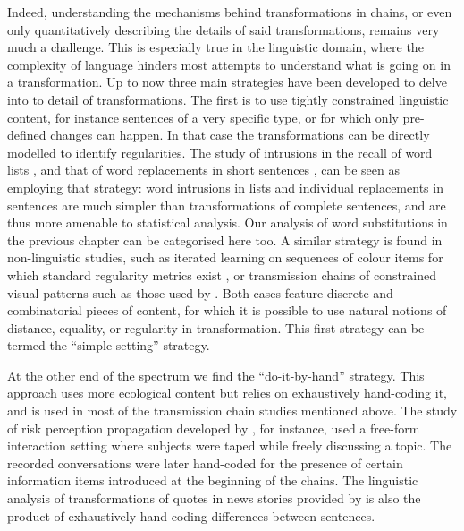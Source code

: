 Indeed, understanding the mechanisms behind transformations in chains,
or even only quantitatively describing the details of said
transformations, remains very much a challenge. This is especially true
in the linguistic domain, where the complexity of language hinders most
attempts to understand what is going on in a transformation. Up to now
three main strategies have been developed to delve into to detail of
transformations. The first is to use tightly constrained linguistic
content, for instance sentences of a very specific type, or for which
only pre-defined changes can happen. In that case the transformations
can be directly modelled to identify regularities. The study of
intrusions in the recall of word lists \autocite[see][ for a
review]{zaromb_temporal_2006}, and that of word replacements in short
sentences
\autocites{potter_regeneration_1990}{lombardi_regeneration_1992}, can be
seen as employing that strategy: word intrusions in lists and individual
replacements in sentences are much simpler than transformations of
complete sentences, and are thus more amenable to statistical analysis.
Our analysis of word substitutions in the previous chapter can be
categorised here too. A similar strategy is found in non-linguistic
studies, such as iterated learning on sequences of colour items for
which standard regularity metrics exist \autocite{cornish_systems_2013},
or transmission chains of constrained visual patterns such as those used
by \textcite{claidiere_cultural_2014}. Both cases feature discrete and
combinatorial pieces of content, for which it is possible to use natural
notions of distance, equality, or regularity in transformation. This
first strategy can be termed the \enquote{simple setting} strategy.

At the other end of the spectrum we find the \enquote{do-it-by-hand}
strategy. This approach uses more ecological content but relies on
exhaustively hand-coding it, and is used in most of the transmission
chain studies mentioned above. The study of risk perception propagation
developed by \textcite{moussaid_amplification_2015}, for instance, used
a free-form interaction setting where subjects were taped while freely
discussing a topic. The recorded conversations were later hand-coded for
the presence of certain information items introduced at the beginning of
the chains. The linguistic analysis of transformations of quotes in news
stories provided by \textcite{lauf_analyzing_2013} is also the product
of exhaustively hand-coding differences between sentences.

